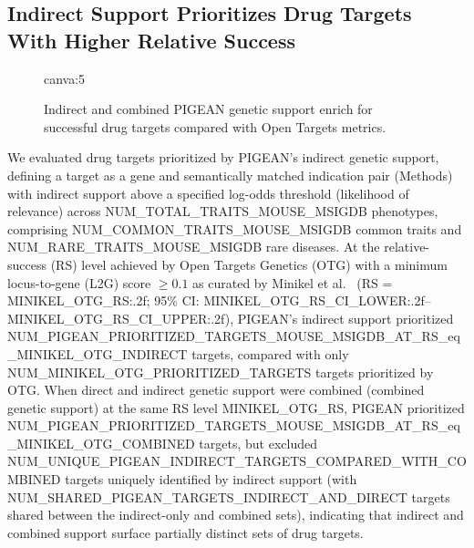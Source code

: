\subsection{Indirect Support Prioritizes Drug Targets With Higher Relative Success}

\begin{figure}[t!]
    \centering
    {{canva:5}}
    \caption{Indirect and combined PIGEAN genetic support enrich for successful drug targets compared with Open Targets metrics.}
    \label{fig:validation-pharma}
\end{figure}

We evaluated drug targets prioritized by PIGEAN's indirect genetic support, defining a target as a gene and semantically matched indication pair (Methods) with indirect support above a specified log-odds threshold (likelihood of relevance) across {{NUM_TOTAL_TRAITS_MOUSE_MSIGDB}} phenotypes, comprising {{NUM_COMMON_TRAITS_MOUSE_MSIGDB}} common traits and {{NUM_RARE_TRAITS_MOUSE_MSIGDB}} rare diseases. At the relative-success (RS) level achieved by Open Targets Genetics (OTG) with a minimum locus-to-gene (L2G) score $\geq 0.1$ as curated by Minikel et al.\ \cite{minikel_refining_2024} (RS = {{MINIKEL_OTG_RS:.2f}}; 95\% CI: {{MINIKEL_OTG_RS_CI_LOWER:.2f}}--{{MINIKEL_OTG_RS_CI_UPPER:.2f}}), PIGEAN's indirect support prioritized {{NUM_PIGEAN_PRIORITIZED_TARGETS_MOUSE_MSIGDB_AT_RS_eq_MINIKEL_OTG_INDIRECT}} targets, compared with only {{NUM_MINIKEL_OTG_PRIORITIZED_TARGETS}} targets prioritized by OTG. When direct and indirect genetic support were combined (combined genetic support) at the same RS level {{MINIKEL_OTG_RS}}, PIGEAN prioritized {{NUM_PIGEAN_PRIORITIZED_TARGETS_MOUSE_MSIGDB_AT_RS_eq_MINIKEL_OTG_COMBINED}} targets, but excluded {{NUM_UNIQUE_PIGEAN_INDIRECT_TARGETS_COMPARED_WITH_COMBINED}} targets uniquely identified by indirect support (with {{NUM_SHARED_PIGEAN_TARGETS_INDIRECT_AND_DIRECT}} targets shared between the indirect-only and combined sets), indicating that indirect and combined support surface partially distinct sets of drug targets.

